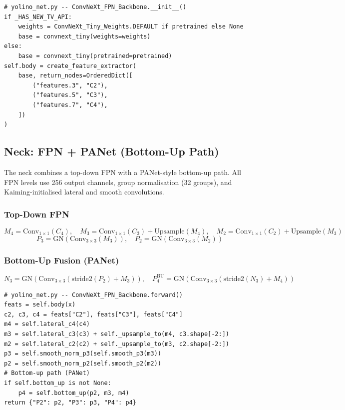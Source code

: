 \documentclass[11pt,a4paper]{article}
\begin{document}
\begin{lstlisting}
# yolino_net.py -- ConvNeXt_FPN_Backbone.__init__()
if _HAS_NEW_TV_API:
    weights = ConvNeXt_Tiny_Weights.DEFAULT if pretrained else None
    base = convnext_tiny(weights=weights)
else:
    base = convnext_tiny(pretrained=pretrained)
self.body = create_feature_extractor(
    base, return_nodes=OrderedDict([
        ("features.3", "C2"),
        ("features.5", "C3"),
        ("features.7", "C4"),
    ])
)
\end{lstlisting}

\subsection{Neck: FPN + PANet (Bottom-Up Path)}
\label{subsec:fpn}

The neck combines a top-down FPN with a PANet-style bottom-up path.
All FPN levels use 256 output channels, group normalisation (32 groups),
and Kaiming-initialised lateral and smooth convolutions.

\subsubsection{Top-Down FPN}

\[
M_4 = \text{Conv}_{1\times1}(C_4),\quad
M_3 = \text{Conv}_{1\times1}(C_3) + \text{Upsample}(M_4),\quad
M_2 = \text{Conv}_{1\times1}(C_2) + \text{Upsample}(M_3)
\]
\[
P_3 = \text{GN}(\text{Conv}_{3\times3}(M_3)),\quad
P_2 = \text{GN}(\text{Conv}_{3\times3}(M_2))
\]

\subsubsection{Bottom-Up Fusion (PANet)}

\[
N_3 = \text{GN}\!\left(\text{Conv}_{3\times3}\!\left(\text{stride2}(P_2) + M_3\right)\right),\quad
P_4^{\text{BU}} = \text{GN}\!\left(\text{Conv}_{3\times3}\!\left(\text{stride2}(N_3) + M_4\right)\right)
\]

\begin{lstlisting}
# yolino_net.py -- ConvNeXt_FPN_Backbone.forward()
feats = self.body(x)
c2, c3, c4 = feats["C2"], feats["C3"], feats["C4"]
m4 = self.lateral_c4(c4)
m3 = self.lateral_c3(c3) + self._upsample_to(m4, c3.shape[-2:])
m2 = self.lateral_c2(c2) + self._upsample_to(m3, c2.shape[-2:])
p3 = self.smooth_norm_p3(self.smooth_p3(m3))
p2 = self.smooth_norm_p2(self.smooth_p2(m2))
# Bottom-up path (PANet)
if self.bottom_up is not None:
    p4 = self.bottom_up(p2, m3, m4)
return {"P2": p2, "P3": p3, "P4": p4}
\end{lstlisting}
\end{document}
